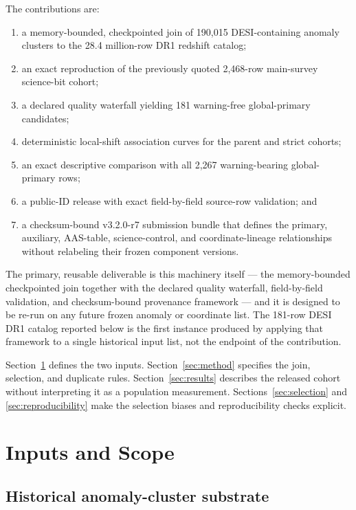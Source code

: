 \documentclass[twocolumn,linenumbers]{aastex702}
\newcommand{\bundleVersion}{v3.2.0-r7}
\begin{document}
The contributions are:
\begin{enumerate}
\item a memory-bounded, checkpointed join of 190,015 DESI-containing anomaly clusters to the
28.4 million-row DR1 redshift catalog;
\item an exact reproduction of the previously quoted 2,468-row main-survey science-bit cohort;
\item a declared quality waterfall yielding 181 warning-free global-primary candidates;
\item deterministic local-shift association curves for the parent and strict cohorts;
\item an exact descriptive comparison with all 2,267 warning-bearing global-primary rows;
\item a public-ID release with exact field-by-field source-row validation; and
\item a checksum-bound \bundleVersion{} submission bundle that defines the primary, auxiliary,
AAS-table, science-control, and coordinate-lineage relationships without relabeling their frozen component versions.
\end{enumerate}

The primary, reusable deliverable is this machinery itself --- the memory-bounded checkpointed
join together with the declared quality waterfall, field-by-field validation, and checksum-bound
provenance framework --- and it is designed to be re-run on any future frozen anomaly or
coordinate list.  The 181-row DESI DR1 catalog reported below is the first instance produced by
applying that framework to a single historical input list, not the endpoint of the contribution.

Section~\ref{sec:data} defines the two inputs.  Section~\ref{sec:method} specifies the join,
selection, and duplicate rules.  Section~\ref{sec:results} describes the released cohort without
interpreting it as a population measurement.  Sections~\ref{sec:selection} and
\ref{sec:reproducibility} make the selection biases and reproducibility checks explicit.

\section{Inputs and Scope}\label{sec:data}

\subsection{Historical anomaly-cluster substrate}\label{sec:anomaly-input}
\end{document}
